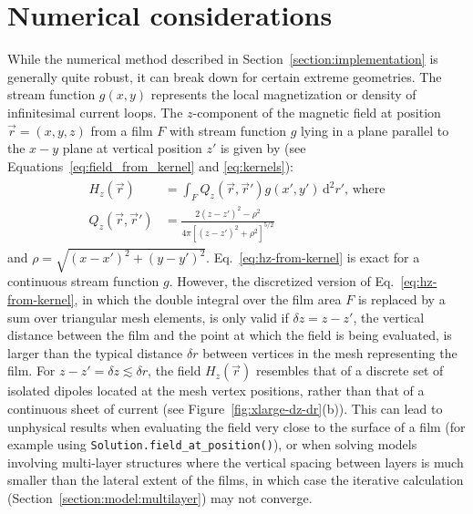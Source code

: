 \documentclass[final,3p,times,twocolumn]{elsarticle}
\newcommand{\inline}[1]{\texttt{#1}\xspace}
\begin{document}
\section{Numerical considerations}
\label{appendix:numerics}
While the numerical method described in Section~\ref{section:implementation} is generally quite robust, it can break down for certain extreme geometries. The stream function $g(x, y)$ represents the local magnetization or density of infinitesimal current loops. The $z$-component of the magnetic field at position $\vec{r}=(x, y, z)$ from a film $F$ with stream function $g$ lying in a plane parallel to the $x-y$ plane at vertical position $z'$ is given by (see Equations~\ref{eq:field_from_kernel} and \ref{eq:kernels}):
\begin{align}
\label{eq:hz-from-kernel}
\begin{split}
    H_z(\vec{r}) &= \int_F Q_z(\vec{r},\vec{r}')g(x', y')\,\mathrm{d}^2r',\,\text{where}\\
    Q_z(\vec{r}, \vec{r}') &=  \frac{2(z-z')^2-\rho^2}
            {4\pi[(z-z')^2+\rho^2]^{5/2}}
\end{split}
\end{align}
and $\rho=\sqrt{(x-x')^2+(y-y')^2}$. Eq.~\ref{eq:hz-from-kernel} is exact for a continuous stream function $g$. However, the discretized version of Eq.~\ref{eq:hz-from-kernel}, in which the double integral over the film area $F$ is replaced by a sum over triangular mesh elements, is only valid if $\delta z = z-z'$, the vertical distance between the film and the point at which the field is being evaluated, is larger than the typical distance $\delta r$ between vertices in the mesh representing the film. For $z-z'=\delta z\lesssim\delta r$, the field $H_z(\vec{r})$ resembles that of a discrete set of isolated dipoles located at the mesh vertex positions, rather than that of a continuous sheet of current (see Figure~\ref{fig:xlarge-dz-dr}(b)). This can lead to unphysical results when evaluating the field very close to the surface of a film (for example using \inline{Solution.field_at_position()}), or when solving models involving multi-layer structures where the vertical spacing between layers is much smaller than the lateral extent of the films, in which case the iterative calculation (Section~\ref{section:model:multilayer}) may not converge.
\end{document}
